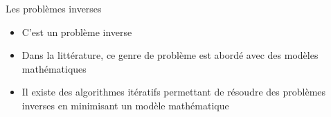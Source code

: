 \begin{frame}{Les problèmes inverses}
\begin{itemize}
\item C'est un problème inverse
\item Dans la littérature, ce genre de problème est abordé avec
    des modèles mathématiques
\item Il existe des algorithmes itératifs permettant de résoudre
    des problèmes inverses en minimisant un modèle mathématique
\end{itemize}
\end{frame}
    